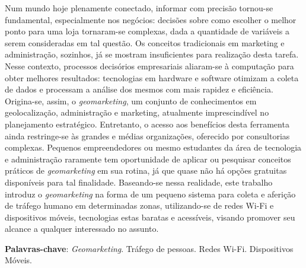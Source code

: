 \documentclass[
		12pt,				%
		openright,			%
		oneside,			%
		a4paper,			%
		chapter=TITLE,		%
		english,			%
		brazil				%
	]{abntex2}
\newif\iffinal
\newif\ifresumo
\begin{document}
\iffinal
	\begin{epigrafe}
		\vspace*{\fill}
			\begin{flushright}


		\textit{"A persistência é o caminho do êxito."\\
			(Charles Chaplin)
				}
		\end{flushright}
	\end{epigrafe}
\fi


\ifresumo
	\setlength{\absparsep}{18pt} %
	\begin{resumo}
			Num mundo hoje plenamente conectado, informar com precisão tornou-se fundamental, especialmente nos negócios: decisões sobre como escolher o melhor ponto para uma loja tornaram-se complexas, dada a quantidade de variáveis a serem consideradas em tal questão. Os conceitos tradicionais em marketing e administração, sozinhos, já se mostram insuficientes para realização desta tarefa. Nesse contexto, processos decisórios empresariais aliaram-se à computação para obter melhores resultados: tecnologias em hardware e software otimizam a coleta de dados e processam a análise dos mesmos com mais rapidez e eficiência. Origina-se, assim, o \emph{geomarketing}, um conjunto de conhecimentos em geolocalização, administração e marketing, atualmente imprescindível no planejamento estratégico. Entretanto, o acesso aos benefícios desta ferramenta ainda restringe-se às grandes e médias organizações, oferecido por consultorias complexas. Pequenos empreendedores ou mesmo estudantes da área de tecnologia e administração raramente tem oportunidade de aplicar ou pesquisar conceitos práticos de \emph{geomarketing} em sua rotina, já que quase não há opções gratuitas disponíveis para tal finalidade. Baseando-se nessa realidade, este trabalho introduz o \emph{geomarketing} na forma de um pequeno sistema para coleta e aferição de tráfego humano em determinadas zonas, utilizando-se de redes Wi-Fi e dispositivos móveis, tecnologias estas baratas e acessíveis, visando promover seu alcance a qualquer interessado no assunto.

		\textbf{Palavras-chave}: \emph{Geomarketing}. Tráfego de pessoas. Redes Wi-Fi. Dispositivos Móveis.

	\end{resumo}
\end{document}

